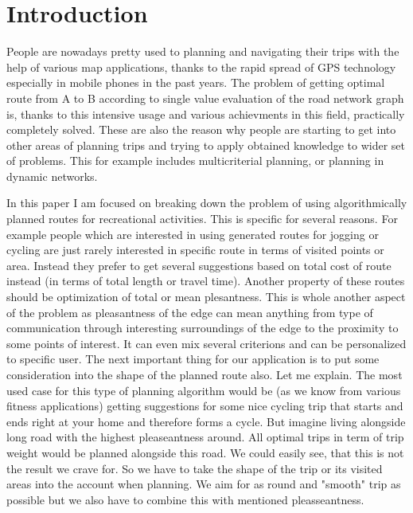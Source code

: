 \documentclass{ctuthesis}
\begin{document}
\maketitle
\chapter{Introduction}
People are nowadays pretty used to planning and navigating their trips with the help of various map applications, thanks to the rapid spread of GPS technology especially in mobile phones in the past years. The problem of getting optimal route from A to B according to single value evaluation of the road network graph is, thanks to this intensive usage and various achievments in this field, practically completely solved. These are also the reason why people are starting to get into other areas of planning trips and trying to apply obtained knowledge to wider set of problems. This for example includes multicriterial planning, or planning in dynamic networks. \par

In this paper I am focused on breaking down the problem of using algorithmically planned routes for recreational activities. This is specific for several reasons. For example people which are interested in using generated routes for jogging or cycling are just rarely interested in specific route in terms of visited points or area. Instead they prefer to get several suggestions based on total cost of route instead (in terms of total length or travel time). Another property of these routes should be optimization of total or mean plesantness. This is whole another aspect of the problem as pleasantness of the edge can mean anything from type of communication through interesting surroundings of the edge to the proximity to some points of interest. It can even mix several criterions and can be personalized to specific user. The next important thing for our application is to put some consideration into the shape of the planned route also. Let me explain. The most used case for this type of planning algorithm would be (as we know from various fitness applications) getting suggestions for some nice cycling trip that starts and ends right at your home and therefore forms a cycle. But imagine living alongside long road with the highest pleaseantness around. All optimal trips in term of trip weight would be planned alongside this road. We could easily see, that this is not the result we crave for. So we have to take the shape of the trip or its visited areas into the account when planning. We aim for as round and "smooth" trip as possible but we also have to combine this with mentioned pleasseantness. \par
\end{document}
